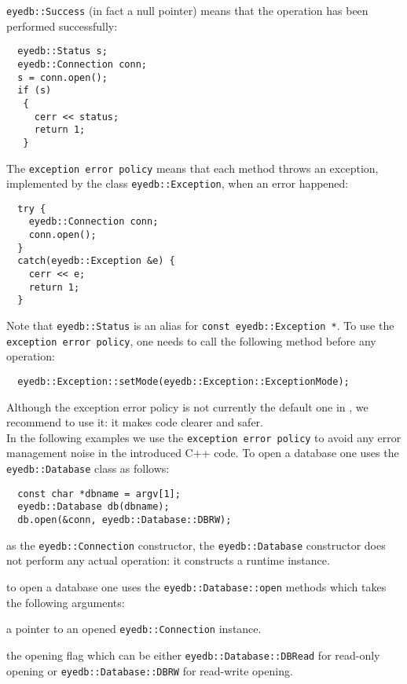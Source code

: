 \texttt{eyedb::Success} (in fact a null pointer) means that the operation
has been performed successfully:
\bi
\item
\verbsize
\begin{verbatim}
  eyedb::Status s;
  eyedb::Connection conn;
  s = conn.open();
  if (s)
   {
     cerr << status;
     return 1;
   }
\end{verbatim}
\normalsize
\ei
The \texttt{exception error policy} means that each \eyedb method throws
an exception, implemented by the class \texttt{eyedb::Exception}, when an error
happened:
\bi
\item
\verbsize
\begin{verbatim}
  try {
    eyedb::Connection conn;
    conn.open();
  }
  catch(eyedb::Exception &e) {
    cerr << e;
    return 1;
  }
\end{verbatim}
\normalsize
\ei
Note that \texttt{eyedb::Status} is an alias for \texttt{const eyedb::Exception *}.
To use the \texttt{exception error policy}, one needs to call the following
method before any operation:
\verbsize
\begin{verbatim}
  eyedb::Exception::setMode(eyedb::Exception::ExceptionMode);
\end{verbatim}
\normalsize
Although the exception error policy is not currently the default one in
\eyedbX, we recommend to use it: it makes code clearer and safer.
\\
In the following examples we use the \texttt{exception error policy}
to avoid any error management noise in the introduced C++ code.
\ee
{}
To open a database one uses the \texttt{eyedb::Database} class as follows:
\verbsize
\begin{verbatim}
  const char *dbname = argv[1];
  eyedb::Database db(dbname);
  db.open(&conn, eyedb::Database::DBRW);
\end{verbatim}
\normalsize
\be
\item as the \texttt{eyedb::Connection} constructor, the \texttt{eyedb::Database}
constructor does not perform any actual operation: it constructs
a runtime instance.
\item to open a database one uses the \texttt{eyedb::Database::open} methods
which takes the following arguments:
\be
\item a pointer to an opened \texttt{eyedb::Connection} instance.
\item the opening flag which can be either \texttt{eyedb::Database::DBRead} for
read-only opening or \texttt{eyedb::Database::DBRW} for read-write opening.
\\
